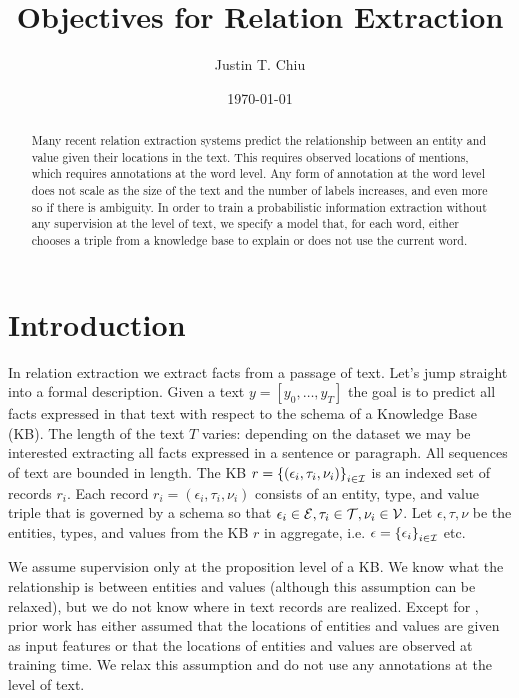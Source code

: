 \documentclass[12pt]{article}
\title{Objectives for Relation Extraction}
\author{
Justin T. Chiu
}
\date{\today}
\begin{document}
\maketitle

\begin{abstract}
Many recent relation extraction systems predict the relationship between an entity and value given
their locations in the text.
This requires observed locations of mentions, which requires annotations at the word level.
Any form of annotation at the word level does not scale as the size of the text
and the number of labels increases, and even more so if there is ambiguity.
In order to train a probabilistic information extraction without any
supervision at the level of text, we specify a model 
that, for each word, either chooses a triple from a knowledge base to explain
or does not use the current word.
\end{abstract}

\section{Introduction}

In relation extraction we extract facts from a passage of text.
Let's jump straight into a formal description.
Given a text $y = [y_0, \ldots, y_T]$ the goal is to predict all facts expressed
in that text with respect to the schema of a Knowledge Base (KB).
The length of the text $T$ varies: depending on the dataset we may be interested extracting
all facts expressed in a sentence or paragraph.
All sequences of text are bounded in length.
The KB $r = \left\{(\epsilon_i, \tau_i, \nu_i)\right\}_{i \in \mathcal{I}}$ is an indexed set of records $r_i$.
Each record $r_i = (\epsilon_i, \tau_i, \nu_i)$ consists of an entity, type, and value triple 
that is governed by a schema so that $\epsilon_i\in \mathcal{E}, \tau_i\in \mathcal{T}, \nu_i\in \mathcal{V}$.
Let $\epsilon,\tau,\nu$ be the entities, types, and values from the KB $r$ in aggregate,
i.e. $\epsilon = \left\{\epsilon_i\right\}_{i \in \mathcal{I}}$ etc.

We assume supervision only at the proposition level of a KB.
We know what the relationship is between entities and values
(although this assumption can be relaxed),
but we do not know where in text records are realized.
Except for \citet{zeng2018copy}, prior work has either assumed that the locations of
entities and values are given as input features or that the locations of entities and values
are observed at training time.
We relax this assumption and do not use any annotations at the level of text.
\end{document}
